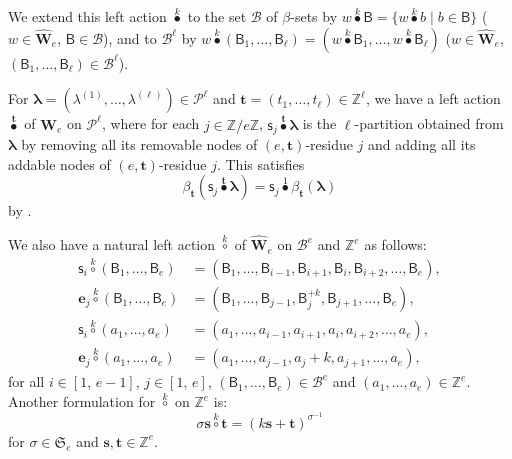 \documentclass[11pt,a4paper,reqno]{amsart}
\numberwithin{equation}{section}
\theoremstyle{plain}
\theoremstyle{definition}
\theoremstyle{remark}
\numberwithin{equation}{section}
\newcommand{\bl}{\boldsymbol{\lambda}}
\newcommand{\UU}{\mathbf{U}}
\newcommand{\fs}{\mathcal{s}}
\newcommand{\bs}{\mathbf{s}}
\newcommand{\bt}{\mathbf{t}}
\newcommand{\wt}{\mathsf{wt}}
\newcommand{\core}{\mathsf{core}}
\newcommand{\ZZ}{\mathbb{Z}}
\newcommand{\cs}{\mathsf{s}}
\newcommand{\BB}{\mathcal{B}}
\newcommand{\B}{\mathsf{B}}
\newcommand{\rr}{\rho}
\newcommand{\PP}{\mathcal{P}}
\newcommand{\Be}{\mathbf{e}}
\newcommand{\EW}{\widehat{\mathbf{W}}}
\newcommand{\AW}{\mathbf{W}}
\newcommand{\sym}[1]{\mathfrak{S}_{#1}}
\newcommand{\DDot}[1]{\mathrel{\overset{#1}{\bullet}}}
\newcommand{\CDot}[1]{\mathrel{\overset{#1}{\circ}}}
\def\Z{{\mathbb Z}}
\begin{document}
We extend this left action $\DDot{k}$ to the set $\BB$ of $\beta$-sets by $w \DDot{k} \B = \{ w \DDot{k} b \mid b \in \B \}$ ($w\in \EW_e$, $\B \in \BB$),
and
to $\BB^{\ell}$ by $w \DDot{k} (\B_1,\dotsc, \B_{\ell}) = (w\DDot{k}\B_1, \dotsc, w \DDot{k} \B_{\ell})$ ($w\in \EW_e$, $(\B_1,\dotsc, \B_{\ell}) \in \BB^{\ell}$).

For $\bl = (\lambda^{(1)},\dotsc, \lambda^{(\ell)}) \in \PP^{\ell}$ and $\bt = (t_1,\dotsc, t_{\ell}) \in \Z^{\ell}$, we have
a left action $\DDot{\bt}$ of $\AW_e$  on $\PP^{\ell}$,
where for each $j \in \ZZ/e\ZZ$, $\cs_j \DDot{\bt} \bl$ is the $\ell$-partition obtained from $\bl$ by removing all its removable nodes of $(e,\bt)$-residue $j$ and adding all its addable nodes of $(e,\bt)$-residue $j$.
This satisfies
\begin{equation*}
\beta_{\bt}(\cs_j \DDot{\bt} \bl) = \cs_j \DDot{1} \beta_{\bt}(\bl)
\end{equation*}
by \cite[(2.17)]{LT}.


We also have a natural left action $\CDot{k}$ of $\EW_e$ on $\BB^e$ and $\ZZ^e$ as follows:
\begin{align*}
\cs_i \CDot{k} (\B_1,\dotsc, \B_{e}) &= (\B_1,\dotsc,\B_{i-1}, \B_{i+1}, \B_{i}, \B_{i+2},\dotsc, \B_{e}), \\
\Be_j \CDot{k} (\B_1,\dotsc, \B_{e}) &= (\B_1,\dotsc,\B_{j-1}, \B_j^{+k}, \B_{j+1},\dotsc, \B_{e}), \\
\cs_i \CDot{k} (a_1,\dotsc, a_{e}) &= (a_1,\dotsc,a_{i-1}, a_{i+1}, a_{i}, a_{i+2},\dotsc, a_{e}), \\
\Be_j \CDot{k} (a_1,\dotsc, a_{e}) &= (a_1,\dotsc,a_{j-1}, a_j +k, a_{j+1},\dotsc, a_{e}),
\end{align*}
for all $i \in [1,\,e-1]$, $j \in [1,\,e]$, $(\B_1,\dotsc, \B_e) \in \BB^e$ and $(a_1,\dotsc, a_e) \in \ZZ^e$.
Another formulation for $\CDot{k}$ on $\ZZ^e$ is:
\begin{equation} \label{E:CDot}
\sigma \bs \CDot{k} \bt = (k\bs + \bt)^{\sigma^{-1}}
\end{equation}
for $\sigma \in \sym{e}$ and $\bs,\bt \in \ZZ^e$.
\end{document}
